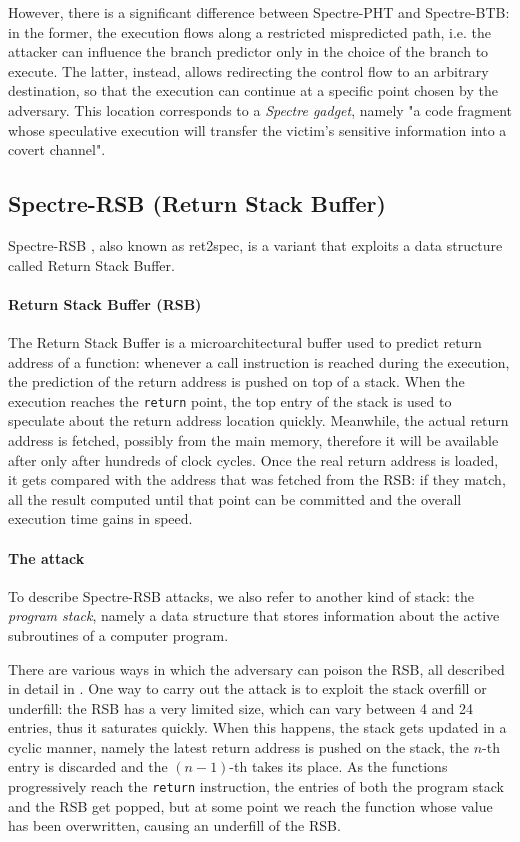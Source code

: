 \documentclass[12pt,a4paper]{book}
\theoremstyle{definition}
\begin{document}
	However, there is a significant difference between Spectre-PHT and Spectre-BTB: in the former, the execution flows along a restricted mispredicted path, i.e. the attacker can influence the branch predictor only in the choice of the branch to execute. The latter, instead, allows redirecting the control flow to an arbitrary destination, so that the execution can continue at a specific point chosen by the adversary. This location corresponds to a \textit{Spectre gadget}, namely "a code fragment whose speculative execution will transfer the victim’s sensitive information into a covert channel"\cite{Kocher2019}.
	
	\subsection{Spectre-RSB (Return Stack Buffer)}\label{sec:spectre-rsb}
	Spectre-RSB \cite{Maisuradze2018} \cite{Koruyeh2018} \cite{Canella2019}, also known as ret2spec, is a variant that exploits a data structure called Return Stack Buffer.
	
	\paragraph{Return Stack Buffer (RSB)}The Return Stack Buffer is a microarchitectural buffer used to predict return address of a function: whenever a call instruction is reached during the execution, the prediction of the return address is pushed on top of a stack. When the execution reaches the \texttt{return} point, the top entry of the stack is used to speculate about the return address location quickly. Meanwhile, the actual return address is fetched, possibly from the main memory, therefore it will be available after only after hundreds of clock cycles. Once the real return address is loaded, it gets compared with the address that was fetched from the RSB: if they match, all the result computed until that point can be committed and the overall execution time gains in speed.
	
	\paragraph{The attack} To describe Spectre-RSB attacks, we also refer to another kind of stack: the \textit{program stack}, namely a data structure that stores information about the active subroutines of a computer program.
	
	There are various ways in which the adversary can poison the RSB, all described in detail in \cite{Koruyeh2018}. One way to carry out the attack is to exploit the stack overfill or underfill: the RSB has a very limited size, which can vary between 4 and 24 entries, thus it saturates quickly. When this happens, the stack gets updated in a cyclic manner, namely the latest return address is pushed on the stack, the $n$-th entry is discarded and the $(n-1)$-th takes its place. As the functions progressively reach the \texttt{return} instruction, the entries of both the program stack and the RSB get popped, but at some point we reach the function whose value has been overwritten, causing an underfill of the RSB.
	
\end{document}
